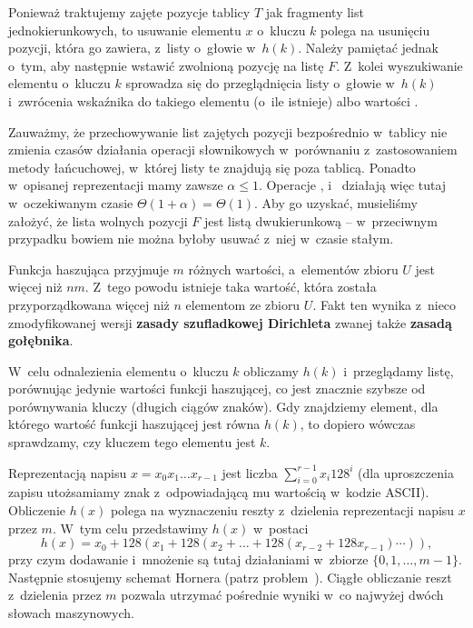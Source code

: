 Ponieważ traktujemy zajęte pozycje tablicy $T$ jak fragmenty list jednokierunkowych, to usuwanie elementu $x$ o~kluczu $k$ polega na usunięciu pozycji, która go zawiera, z~listy o~głowie w~$h(k)$. Należy pamiętać jednak o~tym, aby następnie wstawić zwolnioną pozycję na listę $F$. Z~kolei wyszukiwanie elementu o~kluczu $k$ sprowadza się do przeglądnięcia listy o~głowie w~$h(k)$ i~zwrócenia wskaźnika do takiego elementu (o~ile istnieje) albo wartości .

Zauważmy, że przechowywanie list zajętych pozycji bezpośrednio w~tablicy nie zmienia czasów działania operacji słownikowych w~porównaniu z~zastosowaniem metody łańcuchowej, w~której listy te znajdują się poza tablicą. Ponadto w~opisanej reprezentacji mamy zawsze $\alpha\le1$. Operacje ,  i~ działają więc tutaj w~oczekiwanym czasie $\Theta(1+\alpha)=\Theta(1)$. Aby go uzyskać, musieliśmy założyć, że lista wolnych pozycji $F$ jest listą dwukierunkową -- w~przeciwnym przypadku bowiem nie można byłoby usuwać z~niej w~czasie stałym.

\exercise %
Funkcja haszująca przyjmuje $m$ różnych wartości, a~elementów zbioru $U$ jest więcej niż $nm$. Z~tego powodu istnieje taka wartość, która została przyporządkowana więcej niż $n$ elementom ze zbioru $U$. Fakt ten wynika z~nieco zmodyfikowanej wersji \textbf{zasady szufladkowej Dirichleta} \cite{pigeonholeprinciple} zwanej także \textbf{zasadą gołębnika}.


\exercise %
W~celu odnalezienia elementu o~kluczu $k$ obliczamy $h(k)$ i~przeglądamy listę, porównując jedynie wartości funkcji haszującej, co jest znacznie szybsze od porównywania kluczy (długich ciągów znaków). Gdy znajdziemy element, dla którego wartość funkcji haszującej jest równa $h(k)$, to dopiero wówczas sprawdzamy, czy kluczem tego elementu jest $k$.

\exercise %
Reprezentacją napisu $x=x_0x_1\dots x_{r-1}$ jest liczba $\sum_{i=0}^{r-1}x_i128^i$ (dla uproszczenia zapisu utożsamiamy znak z~odpowiadającą mu wartością w~kodzie ASCII). Obliczenie $h(x)$ polega na wyznaczeniu reszty z~dzielenia reprezentacji napisu $x$ przez $m$. W~tym celu przedstawimy $h(x)$ w~postaci
\[
	h(x) = x_0+128(x_1+128(x_2+\dots+128(x_{r-2}+128x_{r-1})\cdots)),
\]
przy czym dodawanie i~mnożenie są tutaj działaniami w~zbiorze $\{0,1,\dots,m-1\}$. Następnie stosujemy schemat Hornera (patrz problem~). Ciągłe obliczanie reszt z~dzielenia przez $m$ pozwala utrzymać pośrednie wyniki w~co najwyżej dwóch słowach maszynowych.

